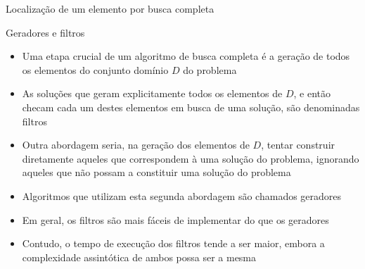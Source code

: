 \begin{frame}[fragile]{Localização de um elemento por busca completa}
\end{frame}

\begin{frame}[fragile]{Geradores e filtros}

    \begin{itemize}
        \item Uma etapa crucial de um algoritmo de busca completa é a geração de todos os elementos
            do conjunto domínio $D$ do problema

        \item As soluções que geram explicitamente todos os elementos de $D$, e então checam
            cada um destes elementos em busca de uma solução, são denominadas filtros

        \item Outra abordagem seria, na geração dos elementos de $D$, tentar construir diretamente
            aqueles que correspondem à uma solução do problema, ignorando aqueles que não
            possam a constituir uma solução do problema

        \item Algoritmos que utilizam esta segunda abordagem são chamados geradores

        \item Em geral, os filtros são mais fáceis de implementar do que os geradores

        \item Contudo, o tempo de execução dos filtros tende a ser maior, embora a complexidade
            assintótica de ambos possa ser a mesma
    \end{itemize}

\end{frame}

